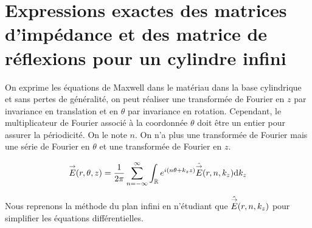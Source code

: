 \section{Expressions exactes des matrices d'impédance et des matrice de réflexions pour un cylindre infini}


  \begin{figure}[!hbt]
    \centering
    \begin{tikzpicture}
      
    \end{tikzpicture}
  \end{figure}

  On exprime les équations de Maxwell dans le matériau dans la base cylindrique et sans pertes de généralité, on peut réaliser une transformée de Fourier en \(z\) par invariance en translation et en \(\theta\) par invariance en rotation.
  Cependant, le multiplicateur de Fourier associé à la coordonnée \(\theta\) doit être un entier pour assurer la périodicité. On le note \(n\). On n'a plus une transformée de Fourier mais une série de Fourier en \(\theta\) et une transformée de Fourier en \(z\).

  \begin{equation}
    \vE(r,\theta,z) = \frac{1}{2\pi}\sum_{n=-\infty}^{\infty}\int_{\RR} e^{i(n \theta + k_z z )}\hat{\vE} (r,n,k_z) \dd{k_z}
  \end{equation}

  Nous reprenons la méthode du plan infini en n'étudiant que \(\hat{\vE} (r,n,k_z)\) pour simplifier les équations différentielles.

